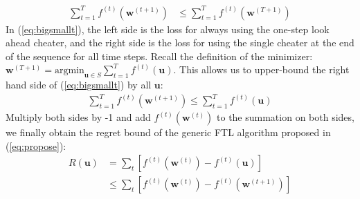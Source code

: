 \documentclass[11pt]{article}
\begin{document}
\begin{align}
\label{eq:bigsmallt}
    \sum_{t=1}^{T} f^{(t)} (\boldsymbol{w}^{(t+1)})&\leq\sum_{t=1}^{T} f^{(t)} (\boldsymbol{w}^{(T+1)})
\end{align}
In (\ref{eq:bigsmallt}), the left side is the loss for always using the one-step look ahead cheater, and the right side is the loss for using the single cheater at the end of the sequence for all time steps. Recall the definition of the minimizer: $\boldsymbol{w}^{(T+1)} = \text{argmin}_{\boldsymbol{u} \in S} \sum_{t=1}^T f^{(t)}(\boldsymbol{u})$. This allows us to upper-bound the right hand side of (\ref{eq:bigsmallt}) by all $\boldsymbol{u}$:
\begin{align}
           \sum_{t=1}^{T} f^{(t)} (\boldsymbol{w}^{(t+1)})
       \leq \sum_{t=1}^{T} f^{(t)} (\boldsymbol{u})
\end{align}
Multiply both sides by -1 and add $f^{(t)}(\boldsymbol{w}^{(t)})$ to the summation on both sides, we finally obtain the regret bound of the generic FTL algorithm proposed in (\ref{eq:propose}):
\begin{align}
        R(\boldsymbol{u})&=\sum_t [f^{(t)}(\boldsymbol{w}^{(t)})-f^{(t)}(\boldsymbol{u})]\\
        &\leq \sum_t [f^{(t)}(\boldsymbol{w}^{(t)})-f^{(t)} (\boldsymbol{w}^{(t+1)})]
\label{eq:FTLregret}
\end{align}

\end{document}
